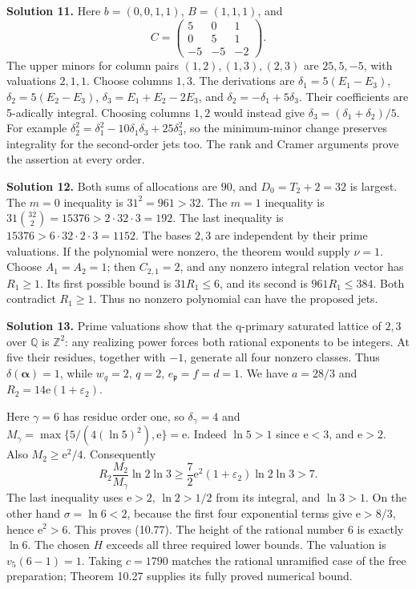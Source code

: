 \documentclass[
  11pt,
  a4paper,
]{article}
\begin{document}
\textbf{Solution 11.} Here \(b=(0,0,1,1)\), \(B=(1,1,1)\), and \[
C=\begin{pmatrix}5&0&1\\0&5&1\\-5&-5&-2\end{pmatrix}.
\] The upper minors for column pairs \((1,2),(1,3),(2,3)\) are
\(25,5,-5\), with valuations \(2,1,1\). Choose columns \(1,3\). The
derivations are \(\delta_1=5(E_1-E_3)\), \(\delta_2=5(E_2-E_3)\),
\(\delta_3=E_1+E_2-2E_3\), and \(\delta_2=-\delta_1+5\delta_3\). Their
coefficients are 5-adically integral. Choosing columns \(1,2\) would
instead give \(\delta_3=(\delta_1+\delta_2)/5\). For example
\(\delta_2^2=\delta_1^2-10\delta_1\delta_3+25\delta_3^2\), so the
minimum-minor change preserves integrality for the second-order jets
too. The rank and Cramer arguments prove the assertion at every order.

\textbf{Solution 12.} Both sums of allocations are \(90\), and
\(D_0=T_2+2=32\) is largest. The \(m=0\) inequality is \(31^2=961>32\).
The \(m=1\) inequality is \(31\binom{32}{2}=15376>2\cdot32\cdot3=192\).
The last inequality is \(15376>6\cdot32\cdot2\cdot3=1152\). The bases
\(2,3\) are independent by their prime valuations. If the polynomial
were nonzero, the theorem would supply \(\nu=1\). Choose \(A_1=A_2=1\);
then \(C_{2,1}=2\), and any nonzero integral relation vector has
\(R_1\ge1\). Its first possible bound is \(31R_1\le6\), and its second
is \(961R_1\le384\). Both contradict \(R_1\ge1\). Thus no nonzero
polynomial can have the proposed jets.

\textbf{Solution 13.} Prime valuations show that the q-primary saturated
lattice of \(2,3\) over \(\mathbb Q\) is \(\mathbb Z^2\): any realizing
power forces both rational exponents to be integers. At five their
residues, together with \(-1\), generate all four nonzero classes. Thus
\(\delta(\boldsymbol\alpha)=1\), while \(w_q=2\), \(q=2\),
\(e_{\mathfrak p}=f=d=1\). We have \(a=28/3\) and
\(R_2=14\mathrm e(1+\varepsilon_2)\).

Here \(\gamma=6\) has residue order one, so \(\delta_\gamma=4\) and
\(M_\gamma=\max\{5/(4(\ln5)^2),\mathrm e\}=\mathrm e\). Indeed
\(\ln5>1\) since \(\mathrm e<3\), and \(\mathrm e>2\). Also
\(M_2\ge\mathrm e^2/4\). Consequently \[
R_2\frac{M_2}{M_\gamma}\ln2\ln3
\ge\frac72\mathrm e^2(1+\varepsilon_2)\ln2\ln3>7.
\] The last inequality uses \(\mathrm e>2\), \(\ln2>1/2\) from its
integral, and \(\ln3>1\). On the other hand \(\sigma=\ln6<2\), because
the first four exponential terms give \(\mathrm e>8/3\), hence
\(\mathrm e^2>6\). This proves (10.77). The height of the rational
number 6 is exactly \(\ln6\). The chosen \(H\) exceeds all three
required lower bounds. The valuation is \(v_5(6-1)=1\). Taking
\(c=1790\) matches the rational unramified case of the free preparation;
Theorem 10.27 supplies its fully proved numerical bound.
\end{document}
